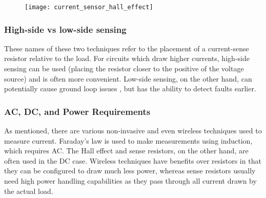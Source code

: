 \begin{figure}[h!]
    \centering
    \texttt{[image: current\_sensor\_hall\_effect]}
    \label{fig:hall-effect}
  \end{figure}

\subsubsection{High-side vs low-side sensing}\label{sec:cur_highlow}
These names of these two techniques refer to the placement of a current-sense resistor relative to the load. For circuits which draw higher currents, high-side sensing can be used
(placing the resistor closer to the positive of the voltage source) and is often more convenient. Low-side sensing, on the other hand, can potentially cause ground loop
issues \cite{currentSenseLowHighSide}, but has the ability to detect faults earlier.

\subsubsection{AC, DC, and Power Requirements}\label{sec:cur_acdc}
As mentioned, there are various non-invasive and even wireless techniques used to measure current. Faraday's law is used to make measurements using induction, which requires AC.
The Hall effect and sense resistors, on the other hand, are often used in the DC case. Wireless techniques have benefits over resistors in that they can be configured to draw much less power,
whereas sense resistors usually need high power handling capabilities as they pass through all current drawn by the actual load.
